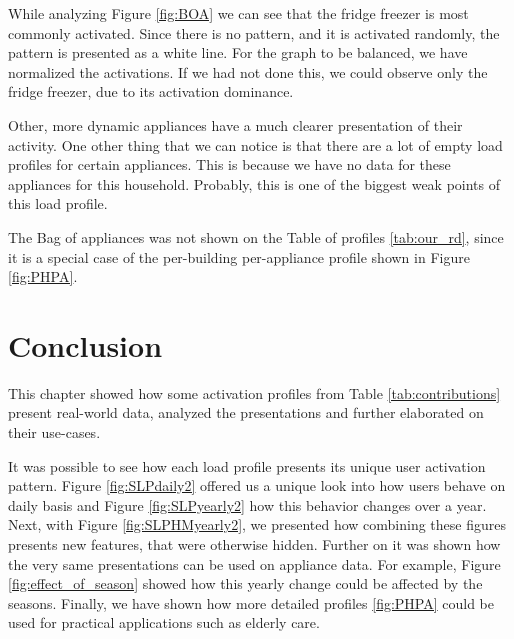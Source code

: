 While analyzing Figure \ref{fig:BOA} we can see that the fridge freezer is most commonly activated.
Since there is no pattern, and it is activated randomly, the pattern is presented as a white line.
For the graph to be balanced, we have normalized the activations.
If we had not done this, we could observe only the fridge freezer, due to its activation dominance. 

Other, more dynamic appliances have a much clearer presentation of their activity. 
One other thing that we can notice is that there are a lot of empty load profiles for certain appliances.
This is because we have no data for these appliances for this household.
Probably, this is one of the biggest weak points of this load profile.

The Bag of appliances was not shown on the Table of profiles \ref{tab:our_rd},
since it is a special case of the per-building per-appliance profile shown in Figure \ref{fig:PHPA}.

\section{Conclusion}

This chapter showed how some activation profiles from Table \ref{tab:contributions} present real-world data, analyzed the presentations and further elaborated on their use-cases.

It was possible to see how each load profile presents its unique user activation pattern. 
Figure \ref{fig:SLPdaily2} offered us a unique look into how users behave on daily basis and Figure \ref{fig:SLPyearly2} how this behavior changes over a year.
Next, with Figure \ref{fig:SLPHMyearly2}, we presented how combining these figures presents new features, that were otherwise hidden.
Further on it was shown how the very same presentations can be used on appliance data.
For example, Figure \ref{fig:effect_of_season} showed how this yearly change could be affected by the seasons.
Finally, we have shown how more detailed profiles \ref{fig:PHPA} could be used for practical applications such as elderly care. 